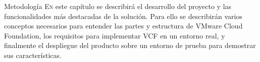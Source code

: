 \begin{chapter}{Metodología}
\label{chap:Metodologia}
\lettrine{E}{n} este capítulo se describirá el desarrollo del proyecto y las funcionalidades más destacadas de la solución. Para ello se describirán varios conceptos necesarios para entender las partes y estructura de VMware Cloud Foundation, los requisitos para implementar VCF en un entorno real, y finalmente el despliegue del producto sobre un entorno de prueba para demostrar sus características.

%



%
%

\end{chapter}